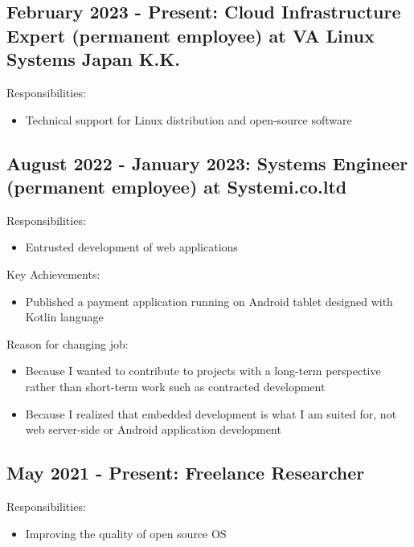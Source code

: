 \documentclass[letterpaper]{article}
\begin{document}
\subsection*{February 2023 - Present: Cloud Infrastructure Expert (permanent employee) at VA Linux Systems Japan K.K.}

\noindent Responsibilities:

\begin{itemize}
  \item Technical support for Linux distribution and open-source software
\end{itemize}

\subsection*{August 2022 - January 2023: Systems Engineer (permanent employee) at Systemi.co.ltd}

\noindent Responsibilities:

\begin{itemize}
  \item Entrusted development of web applications
\end{itemize}

\noindent Key Achievements:

\begin{itemize}
  \item Published a payment application running on Android tablet designed with Kotlin language
\end{itemize}

\noindent Reason for changing job:

\begin{itemize}
  \item Because I wanted to contribute to projects with a long-term perspective rather than short-term work such as contracted development
  \item Because I realized that embedded development is what I am suited for, not web server-side or Android application development
\end{itemize}

\subsection*{May 2021 - Present: Freelance Researcher}

\noindent Responsibilities:

\begin{itemize}
  \item Improving the quality of open source OS
\end{itemize}
\end{document}
